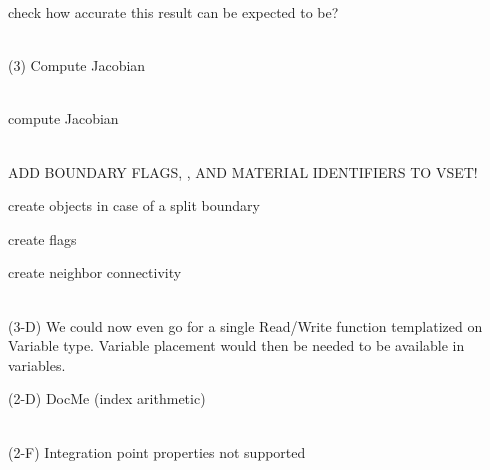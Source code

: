 \begin{DoxyRefList}
\label{todo__todo000262}%
%
check how accurate this result can be expected to be?  
\item[Member \doxylink{classcsmp_1_1_jacobian___integral__d_n_t__op__d_n__d_v_af37409deef2abd7af867099e9c7ecdeb}{csmp\+::Jacobian\+\_\+\+Integral\+\_\+d\+NT\+\_\+op\+\_\+d\+N\+\_\+dV\texorpdfstring{$<$}{<} dim, CELL \texorpdfstring{$>$}{>}\+::Compute\+Contribution} (const CELL$<$ dim $>$ \&) override final]\hfill \\
\label{todo__todo000107}%
%
(3) Compute Jacobian  
\item[Member \doxylink{classcsmp_1_1_jacobian___upwind___integral__d_n_t__op__d_n__d_v_a5095686d2f87133de18907dcce41e954}{csmp\+::Jacobian\+\_\+\+Upwind\+\_\+\+Integral\+\_\+d\+NT\+\_\+op\+\_\+d\+N\+\_\+dV\texorpdfstring{$<$}{<} dim, CELL \texorpdfstring{$>$}{>}\+::Compute\+Contribution} (const CELL$<$ dim $>$ \&) override final]\hfill \\
\label{todo__todo000108}%
%
compute Jacobian  
\item[Class \doxylink{classcsmp_1_1_line_element_mesher}{csmp\+::Line\+Element\+Mesher\texorpdfstring{$<$}{<} dim \texorpdfstring{$>$}{>}} ]\hfill \\
\label{todo__todo000053}%
%
ADD BOUNDARY FLAGS, , AND MATERIAL IDENTIFIERS TO VSET! 



create  objects in case of a split boundary 



create  flags 



create neighbor connectivity  
\item[Class \doxylink{classcsmp_1_1_local_variable_storage}{csmp\+::Local\+Variable\+Storage\texorpdfstring{$<$}{<} dim, STOREE \texorpdfstring{$>$}{>}} ]\hfill \\
\label{todo__todo000016}%
%
(3-\/D) We could now even go for a single Read/\+Write function templatized on Variable type. Variable placement would then be needed to be available in variables. 

\label{todo__todo000017}%
%
(2-\/D) Doc\+Me (index arithmetic)  
\item[Member \doxylink{classcsmp_1_1_local_variable_storage_ae81c2b297f4166821bc3de2856e055ae}{csmp\+::Local\+Variable\+Storage\texorpdfstring{$<$}{<} dim, STOREE \texorpdfstring{$>$}{>}\+::Add\+Property} (const \doxylink{structcsmp_1_1_index}{csmp\+::\+Index} \&)]\hfill \\
\label{todo__todo000152}%
%
(2-\/F) Integration point properties not supported 


\end{DoxyRefList}
